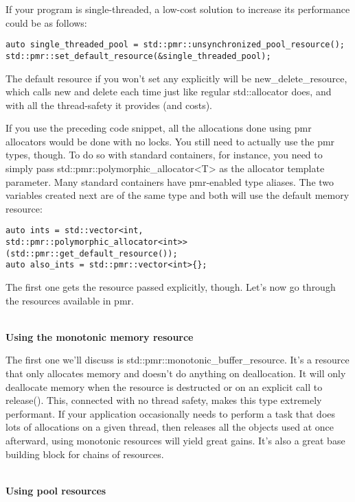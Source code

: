 If your program is single-threaded, a low-cost solution to increase its performance could be as follows:

\begin{lstlisting}[style=styleCXX]
auto single_threaded_pool = std::pmr::unsynchronized_pool_resource();
std::pmr::set_default_resource(&single_threaded_pool);
\end{lstlisting}

The default resource if you won't set any explicitly will be new\_delete\_resource, which calls new and delete each time just like regular std::allocator does, and with all the thread-safety it provides (and costs).

If you use the preceding code snippet, all the allocations done using pmr allocators would be done with no locks. You still need to actually use the pmr types, though. To do so with standard containers, for instance, you need to simply pass std::pmr::polymorphic\_allocator<T> as the allocator template parameter. Many standard containers have pmr-enabled type aliases. The two variables created next are of the same type and both will use the default memory resource:

\begin{lstlisting}[style=styleCXX]
auto ints = std::vector<int,
std::pmr::polymorphic_allocator<int>>(std::pmr::get_default_resource());
auto also_ints = std::pmr::vector<int>{};
\end{lstlisting}

The first one gets the resource passed explicitly, though. Let's now go through the resources available in pmr.

\hspace*{\fill} \\ %
\noindent
\textbf{Using the monotonic memory resource}

The first one we'll discuss is std::pmr::monotonic\_buffer\_resource. It's a resource that only allocates memory and doesn't do anything on deallocation. It will only deallocate memory when the resource is destructed or on an explicit call to release(). This, connected with no thread safety, makes this type extremely performant. If your application occasionally needs to perform a task that does lots of allocations on a given thread, then releases all the objects used at once afterward, using monotonic resources will yield great gains. It's also a great base building block for chains of resources.

\hspace*{\fill} \\ %
\noindent
\textbf{Using pool resources}

